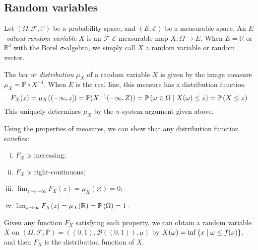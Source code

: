 \subsection{Random variables}
\begin{definition}
	Let \( (\Omega, \mathcal F, \mathbb P) \) be a probability space, and \( (E, \mathcal E) \) be a measurable space.
	An \emph{\( E \)-valued random variable} \( X \) is an \( \mathcal F \)-\( \mathcal E \) measurable map \( X \colon \Omega \to E \).
	When \( E = \mathbb R \) or \( \mathbb R^d \) with the Borel \( \sigma \)-algebra, we simply call \( X \) a random variable or random vector.

	The \emph{law} or \emph{distribution} \( \mu_X \) of a random variable \( X \) is given by the image measure \( \mu_X = \mathbb P \circ X^{-1} \).
	When \( E \) is the real line, this measure has a distribution function
	\[ F_X(z) = \mu_X((-\infty, z]) = \mathbb P(X^{-1}(-\infty,Z)) = \mathbb{P}\left({\omega \in \Omega \mid X(\omega) \leq z}\right) = \mathbb{P}\left({X \leq z}\right) \]
	This uniquely determines \( \mu_X \) by the \( \pi \)-system argument given above.
\end{definition}
Using the properties of measures, we can show that any distribution function satisfies:
\begin{enumerate}[(i)]
	\item \( F_X \) is increasing;
	\item \( F_X \) is right-continuous;
	\item \( \lim_{z \to -\infty} F_X(z) = \mu_X(\varnothing) = 0 \);
	\item \( \lim_{z \to \infty} F_X(z) = \mu_X(\mathbb R) = \mathbb{P}\left({\Omega}\right) = 1 \).
\end{enumerate}
Given any function \( F_X \) satisfying each property, we can obtain a random variable \( X \) on \( (\Omega, \mathcal F, \mathbb P) = ((0,1), \mathcal B((0,1)), \mu) \) by \( X(\omega) = \inf\qty{x \mid \omega \leq f(x)} \), and then \( F_X \) is the distribution function of \( X \).
